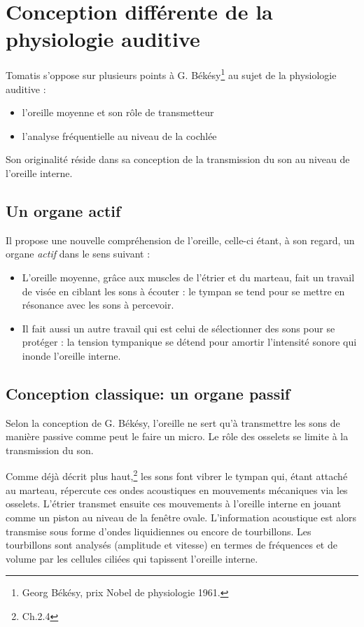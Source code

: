 \section{Conception différente de la physiologie auditive}

Tomatis  s'oppose sur plusieurs points à G. Békésy\footnote{Georg Békésy, prix Nobel de physiologie 1961.} au sujet de la
physiologie auditive : 
\begin{itemize}
	\item l'oreille moyenne et son rôle de transmetteur 
	\item l'analyse fréquentielle au niveau de la cochlée
\end{itemize}

Son originalité réside dans sa conception de la transmission du son
au niveau de l'oreille interne. 

\subsection{Un organe actif}

Il propose une nouvelle compréhension de l'oreille, celle-ci étant,
à son regard, un organe \emph{actif} %
dans le sens suivant :
\begin{itemize}
	\item L'oreille moyenne, grâce aux muscles de l'étrier et du marteau, fait
		un travail de visée en ciblant les sons à écouter : le tympan se tend
		pour se mettre en résonance avec les sons à percevoir.
	\item Il fait aussi un autre travail qui est celui de sélectionner des sons
		pour se protéger : la tension tympanique se détend pour amortir l'intensité
		sonore qui inonde l'oreille interne. 
\end{itemize}

\subsection{Conception classique: un organe passif}

Selon la conception de G. Békésy,
l'oreille ne sert qu'à transmettre les sons de manière passive
comme peut le faire un micro. 
Le rôle des osselets se limite à la transmission du
son. 

Comme déjà décrit plus haut,\footnote{Ch.2.4} les sons font vibrer le tympan qui,
étant attaché au marteau, répercute ces ondes acoustiques en mouvements mécaniques via les osselets. L'étrier transmet ensuite ces mouvements à l'oreille interne en jouant comme un piston au niveau de la fenêtre
ovale. L'information acoustique est alors transmise sous forme d'ondes
liquidiennes ou encore de tourbillons. Les tourbillons sont analysés (amplitude et vitesse) en termes de fréquences et de volume par les
cellules ciliées qui tapissent l'oreille interne.

